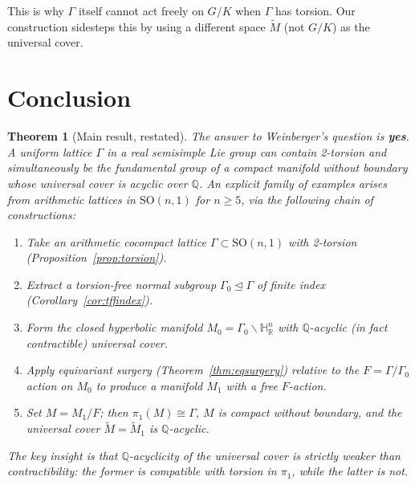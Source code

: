 \documentclass[12pt]{article}
\newtheorem{theorem}{Theorem}[section]
\newcommand{\R}{\mathbb{R}}
\newcommand{\Q}{\mathbb{Q}}
\newcommand{\HH}{\mathbb{H}}
\newcommand{\SO}{\mathrm{SO}}
\newcommand{\tilM}{\widetilde{M}}
\begin{document}
This is why $\Gamma$ itself cannot act freely on $G/K$ when $\Gamma$ has torsion.  Our
construction sidesteps this by using a different space $\tilM$ (not $G/K$) as the universal cover.

\section{Conclusion}

\begin{theorem}[Main result, restated]
The answer to Weinberger's question is \textbf{yes}.  A uniform lattice $\Gamma$ in a real
semisimple Lie group can contain 2-torsion and simultaneously be the fundamental group of a
compact manifold without boundary whose universal cover is acyclic over $\Q$.  An explicit
family of examples arises from arithmetic lattices in $\SO(n,1)$ for $n \geq 5$, via the
following chain of constructions:
\begin{enumerate}
\item Take an arithmetic cocompact lattice $\Gamma \subset \SO(n,1)$ with 2-torsion
      (Proposition~\ref{prop:torsion}).
\item Extract a torsion-free normal subgroup $\Gamma_0 \trianglelefteq \Gamma$ of finite index
      (Corollary~\ref{cor:tffindex}).
\item Form the closed hyperbolic manifold $M_0 = \Gamma_0 \backslash \HH^n_\R$ with $\Q$-acyclic
      (in fact contractible) universal cover.
\item Apply equivariant surgery (Theorem~\ref{thm:eqsurgery}) relative to the $F = \Gamma/\Gamma_0$
      action on $M_0$ to produce a manifold $M_1$ with a free $F$-action.
\item Set $M = M_1/F$; then $\pi_1(M) \cong \Gamma$, $M$ is compact without boundary, and
      the universal cover $\tilM = \tilM_1$ is $\Q$-acyclic.
\end{enumerate}
The key insight is that $\Q$-acyclicity of the universal cover is strictly weaker than
contractibility: the former is compatible with torsion in $\pi_1$, while the latter is not.
\end{theorem}
\end{document}
